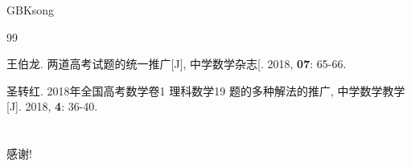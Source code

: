 \documentclass[a4paper, 12pt, twoside]{ctexart}
\begin{document}
\begin{CJK*}{GBK}{song}
\begin{thebibliography}{99}
\setlength{\itemsep}{-0.75ex}
王伯龙. 两道高考试题的统一推广[J], 中学数学杂志[. 2018,  \textbf{07}: 65-66.

圣转红. 2018年全国高考数学卷1 理科数学19 题的多种解法的推广, 中学数学教学[J]. 2018, \textbf{4}: 36-40.
\end{thebibliography}

\newpage
\pagestyle{plain}
\section*{}
感谢!
\thispagestyle{plain}
\end{CJK*}
\end{document}
